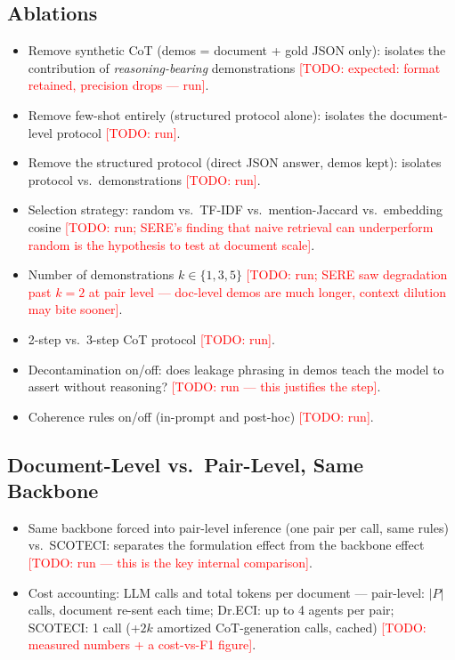 \documentclass[11pt]{article}
\newcommand{\todo}[1]{\textcolor{red}{[TODO: #1]}}
\newcommand{\method}{SCOTECI}
\begin{document}
\subsection{Ablations}
\label{sec:ablations}
\begin{itemize}
  \item Remove synthetic CoT (demos = document + gold JSON only): isolates the
        contribution of \emph{reasoning-bearing} demonstrations
        \todo{expected: format retained, precision drops --- run}.
  \item Remove few-shot entirely (structured protocol alone): isolates the
        document-level protocol \todo{run}.
  \item Remove the structured protocol (direct JSON answer, demos kept):
        isolates protocol vs.\ demonstrations \todo{run}.
  \item Selection strategy: random vs.\ TF-IDF vs.\ mention-Jaccard vs.\
        embedding cosine \todo{run; SERE's finding that naive retrieval can
        underperform random is the hypothesis to test at document scale}.
  \item Number of demonstrations $k \in \{1, 3, 5\}$ \todo{run; SERE saw
        degradation past $k=2$ at pair level --- doc-level demos are much
        longer, context dilution may bite sooner}.
  \item 2-step vs.\ 3-step CoT protocol \todo{run}.
  \item Decontamination on/off: does leakage phrasing in demos teach the model
        to assert without reasoning? \todo{run --- this justifies the step}.
  \item Coherence rules on/off (in-prompt and post-hoc) \todo{run}.
\end{itemize}

\subsection{Document-Level vs.\ Pair-Level, Same Backbone}
\label{sec:cost}
\begin{itemize}
  \item Same backbone forced into pair-level inference (one pair per call, same
        rules) vs.\ \method{}: separates the formulation effect from the
        backbone effect \todo{run --- this is the key internal comparison}.
  \item Cost accounting: LLM calls and total tokens per document ---
        pair-level: $|P|$ calls, document re-sent each time; Dr.ECI: up to 4
        agents per pair; \method{}: 1 call (+$2k$ amortized CoT-generation
        calls, cached) \todo{measured numbers + a cost-vs-F1 figure}.
\end{itemize}
\end{document}
